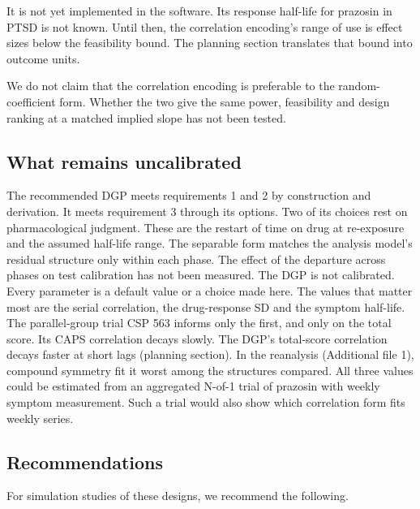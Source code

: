 \documentclass[
  11pt,
]{article}
\begin{document}
It is not yet implemented in the software. Its response half-life for
prazosin in PTSD is not known. Until then, the correlation encoding's
range of use is effect sizes below the feasibility bound. The planning
section translates that bound into outcome units.

We do not claim that the correlation encoding is preferable to the
random-coefficient form. Whether the two give the same power,
feasibility and design ranking at a matched implied slope has not been
tested.

\subsection{What remains uncalibrated}\label{what-remains-uncalibrated}

The recommended DGP meets requirements 1 and 2 by construction and
derivation. It meets requirement 3 through its options. Two of its
choices rest on pharmacological judgment. These are the restart of
time on drug at re-exposure and the assumed half-life range. The
separable form matches the analysis model's residual structure only
within each phase. The effect of the departure across phases on test
calibration has not been measured. The DGP is not calibrated. Every
parameter is a default value or a choice made here. The values that
matter most are the serial correlation, the drug-response SD and the
symptom half-life. The parallel-group trial CSP 563 informs only the
first, and only on the total score. Its CAPS correlation decays
slowly. The DGP's total-score correlation decays faster at short lags
(planning section). In the reanalysis (Additional file 1), compound
symmetry fit it worst among the structures compared. All three values
could be estimated from an aggregated N-of-1 trial of prazosin with
weekly symptom measurement. Such a trial would also show which
correlation form fits weekly series.

\subsection{Recommendations}\label{recommendations}

For simulation studies of these designs, we recommend the following.
\end{document}
